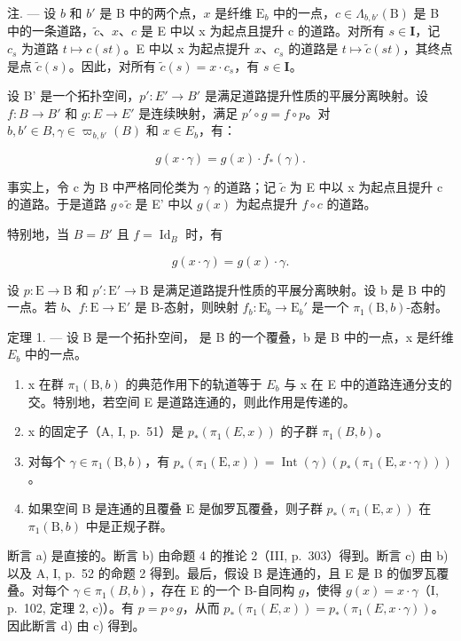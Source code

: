 注. --- 设 \(b\) 和 \(b'\) 是 B 中的两个点，\(x\) 是纤维 \(\mathrm{E}_b\) 中的一点，\(c \in \Lambda_{b,b'}(\mathrm{B})\) 是 B 中的一条道路，\(\widetilde{c}\)、\(x\)、\(c\) 是 E 中以 x 为起点且提升 c 的道路。对所有 \(s \in \mathbf{I}\)，记 \(c_s\) 为道路 \(t \mapsto c(st)\)。E 中以 x 为起点提升 \(x\)、\(c_s\) 的道路是 \(t \mapsto \widetilde{c}(st)\)，其终点是点 \(\widetilde{c}(s)\)。因此，对所有 \(\widetilde{c}(s) = x \cdot c_s\)，有 \(s \in \mathbf{I}\)。

设 B' 是一个拓扑空间，\(p'\colon E'\to B'\) 是满足道路提升性质的平展分离映射。设 \(f\colon B\to B'\) 和 \(g\colon E\to E'\) 是连续映射，满足 \(p'\circ g=f\circ p\)。对 \(b, b'\in B, \gamma\in\varpi_{b,b'}(B)\) 和 \(x\in E_b\)，有：

\[
g (x \cdot \gamma) = g (x) \cdot f _ {*} (\gamma).\tag{3}
\]

事实上，令 c 为 B 中严格同伦类为 \(\gamma\) 的道路；记 \(\widetilde{c}\) 为 E 中以 x 为起点且提升 c 的道路。于是道路 \(g \circ \widetilde{c}\) 是 E' 中以 \(g(x)\) 为起点提升 \(f \circ c\) 的道路。

特别地，当 \(B = B'\) 且 \(f = \operatorname{Id}_{B}\) 时，有

\[
g (x \cdot \gamma) = g (x) \cdot \gamma .\tag{4}
\]

设 \(p \colon \mathrm{E} \to \mathrm{B}\) 和 \(p' \colon \mathrm{E}' \to \mathrm{B}\) 是满足道路提升性质的平展分离映射。设 b 是 B 中的一点。若 \(b\)、\(f \colon \mathrm{E} \to \mathrm{E}'\) 是 B-态射，则映射 \(f_b \colon \mathrm{E}_b \to \mathrm{E}_b'\) 是一个 \(\pi_1(\mathrm{B}, b)\)-态射。

定理 1. --- 设 B 是一个拓扑空间， 是 B 的一个覆叠，b 是 B 中的一点，x 是纤维 \(E_{b}\) 中的一点。

\begin{enumerate}
\def\labelenumi{\alph{enumi})}
\item
  x 在群 \(\pi_{1}(\mathrm{B},b)\) 的典范作用下的轨道等于 \(E_{b}\) 与 x 在 E 中的道路连通分支的交。特别地，若空间 E 是道路连通的，则此作用是传递的。
\item
  x 的固定子（A, I, p.~51）是 \(p_{*}(\pi_{1}(E,x))\) 的子群 \(\pi_{1}(B,b)\)。
\item
  对每个 \(\gamma \in \pi_1(\mathrm{B},b)\)，有 \(p_*(\pi_1(\mathrm{E},x)) = \operatorname{Int}(\gamma)(p_*(\pi_1(\mathrm{E},x \cdot \gamma)))\)。
\item
  如果空间 B 是连通的且覆叠 E 是伽罗瓦覆叠，则子群 \(p_{*}(\pi_{1}(\mathrm{E},x))\) 在 \(\pi_{1}(\mathrm{B},b)\) 中是正规子群。
\end{enumerate}

断言 a) 是直接的。断言 b) 由命题 4 的推论 2（III, p.~303）得到。断言 c) 由 b) 以及 A, I, p.~52 的命题 2 得到。最后，假设 B 是连通的，且 E 是 B 的伽罗瓦覆叠。对每个 \(\gamma \in \pi_1(B,b)\)，存在 E 的一个 B-自同构 \(g\)，使得 \(g(x) = x \cdot \gamma\)（I, p.~102, 定理 2, c)）。有 \(p = p \circ g\)，从而 \(p_*(\pi_1(E,x)) = p_*(\pi_1(E,x \cdot \gamma))\)。因此断言 d) 由 c) 得到。
\relax{}
